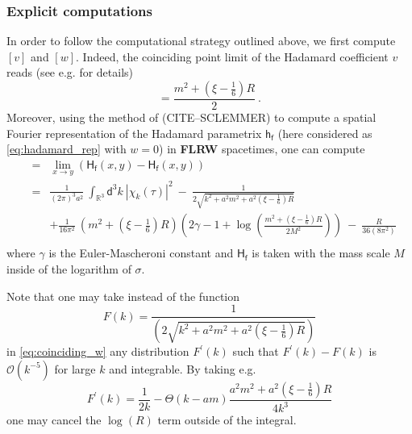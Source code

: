\documentclass[12pt]{book}
\newcommand{\abs}[1]{\left|#1\right|}
\let\int\int
\newcommand{\Ocal}{\mathcal{O}}
\newcommand{\Rbb}{\mathbb{R}}
\newcommand{\Hsf}{\mathsf{H}}
\newcommand{\dsf}{\mathsf{d}}
\newcommand{\fsf}{\mathsf{f}}
\newcommand{\hsf}{\mathsf{h}}
\theoremstyle{break}
\begin{document}
\subsubsection{Explicit computations}


In order to follow the computational strategy outlined above, we first compute $[v]$ and $[w]$.  Indeed, the coinciding point limit of the Hadamard coefficient $v$ reads (see e.g. \cite[Section III.1.2]{hack_backreaction_2010} for details)
%
\begin{equation*}
[v]=\frac{m^2+\left(\xi-\frac16\right)R}{2} \ .
\label{eq:coinciding_v}
\end{equation*}
%
Moreover, using the method of (CITE--SCLEMMER) to compute a spatial Fourier representation of the Hadamard parametrix $\hsf_\fsf$ (here considered as \eqref{eq:hadamard_rep} with $w=0$) in \textbf{FLRW} spacetimes, one can compute 
%
\begin{eqnarray}
[w] &=& \lim_{x\to y} \left(\Hsf_\fsf(x,y) - \Hsf_\fsf(x,y) \right) \nonumber \\
&=& \frac{1}{(2\pi)^3 a^2} \ \int_{\Rbb^3} \dsf^3k \ \abs{\chi_k(\tau)}^2 \ - \ \frac{1}{2\sqrt{k^2+a^2m^2+a^2\left(\xi-\frac16\right)R}} \nonumber \\
%
&& + \frac{1}{16\pi^2} \ \left(m^2+\left(\xi-\frac16\right)R\right)\left(2\gamma-1+\log\left(
\frac{m^2+\left(\xi-\frac16\right)R}{2M^2}\right)\right) \ - \ \frac{R}{36(8\pi^2)} \nonumber \\
\label{eq:coinciding_w} 
\end{eqnarray}
%
where $\gamma$ is the Euler-Mascheroni constant and $\Hsf_\fsf$ is taken with the mass scale $M$ inside of the logarithm of $\sigma$.


Note that one may take instead of the function 
%
\begin{equation*}
F(k) = \frac{1}{(2\sqrt{k^2+a^2m^2+a^2\left(\xi-\frac16\right)R})}
\end{equation*}
%
in \eqref{eq:coinciding_w} any distribution $F^\prime(k)$ such that $F^\prime(k)-F(k)$ is $\Ocal(k^{-5})$ for large $k$ and integrable. By taking e.g. 
%
\begin{equation*}
F^\prime(k) = \frac{1}{2k} - \Theta(k-am)\frac{a^2 m^2 + a^2 \left( \xi - \frac16 \right) R}{4k^3}
\end{equation*}
%
one may cancel the $\log\left(R\right)$ term outside of the integral.
\end{document}
